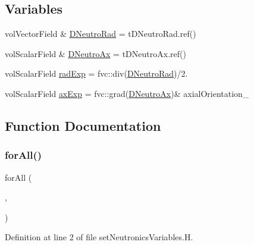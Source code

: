 \subsection*{Variables}
\begin{DoxyCompactItemize}
\item 
vol\+Vector\+Field \& \hyperlink{setNeutronicsVariables_8H_a87a8e73540cc64ca6321cea333ded9ac}{D\+Neutro\+Rad} = t\+D\+Neutro\+Rad.\+ref()
\item 
vol\+Scalar\+Field \& \hyperlink{setNeutronicsVariables_8H_acbede4ae4993afe497317c8781340cb6}{D\+Neutro\+Ax} = t\+D\+Neutro\+Ax.\+ref()
\item 
vol\+Scalar\+Field \hyperlink{setNeutronicsVariables_8H_aa05feccdc89593a9e6aa6a71e66ba849}{rad\+Exp} = fvc\+::div(\hyperlink{setNeutronicsVariablesLowMem_8H_a87a8e73540cc64ca6321cea333ded9ac}{D\+Neutro\+Rad})/2.
\item 
vol\+Scalar\+Field \hyperlink{setNeutronicsVariables_8H_a0a73dc65b2186db6b029ee203c1b2a00}{ax\+Exp} = fvc\+::grad(\hyperlink{setNeutronicsVariablesLowMem_8H_acbede4ae4993afe497317c8781340cb6}{D\+Neutro\+Ax})\& axial\+Orientation\+\_\+
\end{DoxyCompactItemize}


\subsection{Function Documentation}
\mbox{\label{setNeutronicsVariables_8H_a2428955ee674d42574e73d905589463a}} 
\subsubsection{\texorpdfstring{for\+All()}{forAll()}\hspace{0.1cm}{\footnotesize\ttfamily [1/2]}}
{\footnotesize\ttfamily for\+All (\begin{DoxyParamCaption}\item[{C\+Rentries\+\_\+}]{,  }\item[{C\+RzoneI}]{ }\end{DoxyParamCaption})}



Definition at line 2 of file set\+Neutronics\+Variables.\+H.




